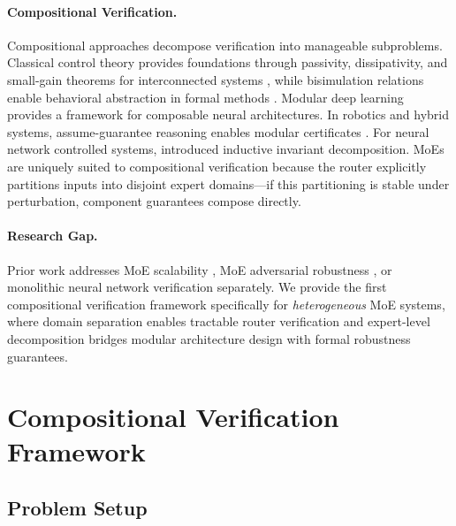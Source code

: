 \documentclass{article}
\theoremstyle{plain}
\theoremstyle{remark}
\begin{document}
\paragraph{Compositional Verification.} Compositional approaches decompose verification into manageable subproblems. Classical control theory provides foundations through passivity, dissipativity, and small-gain theorems for interconnected systems \citep{willems1972,zames1966}, while bisimulation relations enable behavioral abstraction in formal methods \citep{milner1989}. Modular deep learning \citep{pfeiffer2023} provides a framework for composable neural architectures. In robotics and hybrid systems, assume-guarantee reasoning enables modular certificates \citep{henzinger1998}. For neural network controlled systems, \citet{zhou2023compositional} introduced inductive invariant decomposition. MoEs are uniquely suited to compositional verification because the router explicitly partitions inputs into disjoint expert domains---if this partitioning is stable under perturbation, component guarantees compose directly.

\paragraph{Research Gap.} Prior work addresses MoE scalability \citep{dai2024,deepseek2024}, MoE adversarial robustness \citep{puigcerver2022,zhang2025moe}, or monolithic neural network verification \citep{wang2021} separately. We provide the first compositional verification framework specifically for \textit{heterogeneous} MoE systems, where domain separation enables tractable router verification and expert-level decomposition bridges modular architecture design with formal robustness guarantees.

\section{Compositional Verification Framework}

\subsection{Problem Setup}
\end{document}
